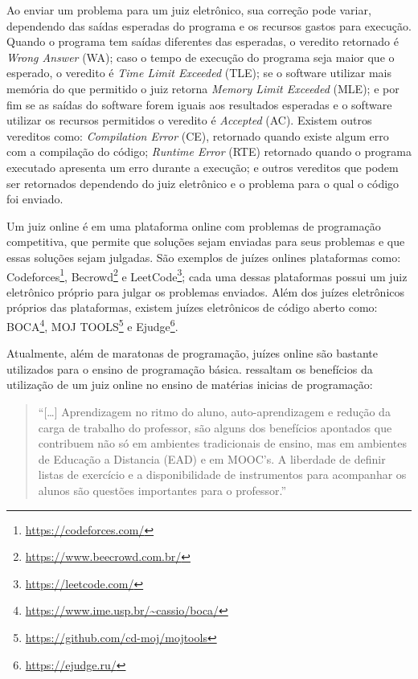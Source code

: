 Ao enviar um problema para um juiz eletrônico, sua correção pode variar, dependendo das saídas esperadas do programa e os recursos gastos para execução. Quando o programa tem saídas diferentes das esperadas, o veredito retornado é \textit{Wrong Answer} (WA); caso o tempo de execução do programa seja maior que o esperado, o veredito é \textit{Time Limit Exceeded} (TLE); se o software utilizar mais memória do que permitido o juiz retorna \textit{Memory Limit Exceeded} (MLE); e por fim se as saídas do software forem iguais aos resultados esperadas e o software utilizar os recursos permitidos o veredito é \textit{Accepted} (AC). Existem outros vereditos como: \textit{Compilation Error} (CE), retornado quando existe algum erro com a compilação do código; \textit{Runtime Error} (RTE) retornado quando o programa executado apresenta um erro durante a execução; e outros vereditos que podem ser retornados dependendo do juiz eletrônico e o problema para o qual o código foi enviado.  


Um juiz online é em uma plataforma online com problemas de programação competitiva, que permite que soluções sejam enviadas para seus problemas e que essas soluções sejam julgadas. São exemplos de juízes onlines plataformas como: Codeforces\footnote{\url{https://codeforces.com/}}, Becrowd\footnote{\url{https://www.beecrowd.com.br/}} e LeetCode\footnote{\url{https://leetcode.com/}}; cada uma dessas plataformas possui um juiz eletrônico próprio para julgar os problemas enviados. Além dos juízes eletrônicos próprios das plataformas, existem juízes eletrônicos de código aberto como: BOCA\footnote{\url{https://www.ime.usp.br/~cassio/boca/}}, MOJ TOOLS\footnote{\url{https://github.com/cd-moj/mojtools}} e Ejudge\footnote{\url{https://ejudge.ru/}}.

Atualmente, além de maratonas de programação, juízes online são bastante utilizados para o ensino de programação básica.  ressaltam os benefícios da utilização de um juiz online no ensino de matérias inicias de programação:

\begin{quote}
    ``[\dots] Aprendizagem no ritmo do aluno, auto-aprendizagem e redução da carga de trabalho do professor, são alguns dos benefícios apontados que contribuem não só em ambientes tradicionais de ensino, mas em ambientes de Educação a Distancia (EAD) e em MOOC’s. A liberdade de definir listas de exercício e a disponibilidade de instrumentos para acompanhar os alunos são questões importantes para o professor.'' \cite[p.18-19]{francisco2016juiz}
\end{quote}

